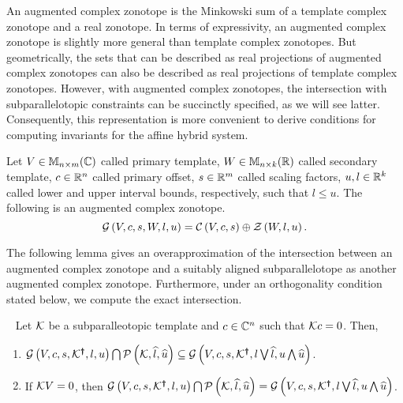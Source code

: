 An augmented complex zonotope is the Minkowski sum of a template
complex zonotope and a real zonotope. In terms of expressivity, an
augmented complex zonotope is slightly more general than template
complex zonotopes.  But geometrically, the sets that can be described
as real projections of augmented complex zonotopes can also be
described as real projections of template complex zonotopes.  However,
with augmented complex zonotopes, the intersection with
subparallelotopic constraints can be succinctly specified, as we will
see latter. Consequently, this representation is more convenient to
derive conditions for computing invariants for the affine hybrid
system.
%
\begin{definition}
Let $V\in\mathbb{M}_{n\times m}(\mathbb{C})$ called primary template, $W\in\mathbb{M}_{n\times k}(\mathbb{R})$
called secondary template, $c\in\mathbb{R}^n$ called primary offset,
$s\in\mathbb{R}^m$ called scaling factors, $u,l\in\mathbb{R}^k$ called lower
and upper interval bounds, respectively, such that $l\leq u$.  The
following is an augmented complex
zonotope.
\begin{equation*}
\mathcal{G}\left(V,c,s,W,l,u\right) = \mathcal{C}\left(V,c,s\right)\oplus\mathcal{Z}\left(W,l,u\right).
\end{equation*}
\end{definition}
%
The following lemma gives an overapproximation of the intersection
between an augmented complex zonotope and a suitably aligned
subparallelotope as another augmented complex zonotope.  Furthermore,
under an orthogonality condition stated below, we compute the exact
intersection.
%
\begin{lemma}~\label{lem:acz-int}
Let $\mathcal{K}$ be a subparalleotopic template and $c\in\mathbb{C}^n$
such that $\mathcal{K} c=0$.  Then,
\begin{enumerate}
\item
  $\mathcal{G}\left(V,c,s,\mathcal{K}^{\bm{\dagger}},l,u\right)\bigcap\mathcal{P}\left(\mathcal{K},\widehat{l},\widehat{u}\right)\subseteq
  \mathcal{G}\left(V,c,s,\mathcal{K}^{\bm{\dagger}},l\bigvee\widehat{l},u\bigwedge\widehat{u}\right)$.
\item If $\mathcal{K} V=0$, then $\mathcal{G}\left(V,c,s,\mathcal{K}^{\bm{\dagger}},l,u\right)\bigcap\mathcal{P}\left(\mathcal{K},\widehat{l},\widehat{u}\right)=
  \mathcal{G}\left(V,c,s,\mathcal{K}^{\bm{\dagger}},l\bigvee\widehat{l},u\bigwedge\widehat{u}\right)$.
\end{enumerate}
\end{lemma}
%
